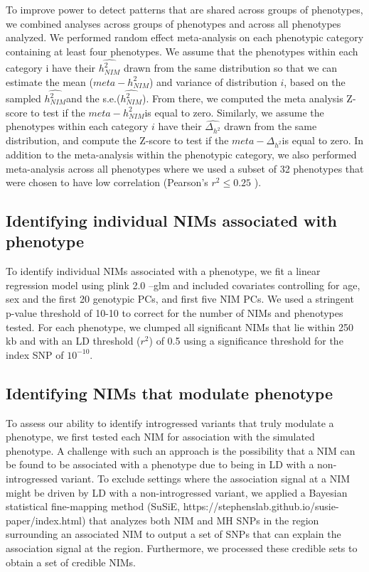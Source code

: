 To improve power to detect patterns that are shared across groups of phenotypes, we combined analyses across groups of phenotypes and across all phenotypes analyzed. We performed random effect meta-analysis on each phenotypic category containing at least four phenotypes. We assume that the phenotypes within each category i have their $\hat{h^2_{NIM}}$ drawn from the same distribution so that we can estimate the mean ($meta-h^2_{NIM}$) and variance of distribution $i$, based on the sampled $\hat{h^2_{NIM}}$and the s.e.($\hat{h^2_{NIM}}$). From there, we computed the meta analysis Z-score to test if the $meta-h^2_{NIM}$is equal to zero. Similarly, we assume the phenotypes within each category $i$ have their $\hat{\Delta_{h^2}}$ drawn from the same distribution, and compute the Z-score to test if the $meta-\Delta_{h^2}$is equal to zero. In addition to the meta-analysis within the phenotypic category, we also performed meta-analysis across all phenotypes where we used a subset of 32 phenotypes that were chosen to have low correlation (Pearson’s $r^2\le0.25$ ). 

\subsection{Identifying individual NIMs associated with phenotype}
To identify individual NIMs associated with a phenotype, we fit a linear regression model using plink 2.0 --glm and included covariates controlling for age, sex and the first 20 genotypic PCs, and first five NIM PCs. We used  a stringent p-value threshold of 10-10 to correct for the number of NIMs and phenotypes tested. For each phenotype, we clumped all significant NIMs that lie within 250 kb and with an LD threshold ($r^2$) of 0.5 using a significance threshold for the index SNP of $10^{-10}$.


\subsection{Identifying NIMs that modulate phenotype}
To assess our ability to identify introgressed variants that truly modulate a phenotype, we first tested each NIM for association with the simulated phenotype. A challenge with such an approach is the possibility that a NIM can be found to be associated with a phenotype due to being in LD with a non-introgressed variant. To exclude settings where the association signal at a NIM might be driven by LD with a non-introgressed variant, we applied a Bayesian statistical fine-mapping method (SuSiE, https://stephenslab.github.io/susie-paper/index.html) that analyzes both NIM and MH SNPs in the region surrounding an associated NIM to output a set of SNPs that can explain the association signal at the region. Furthermore, we processed these credible sets to obtain a set of credible NIMs. 

